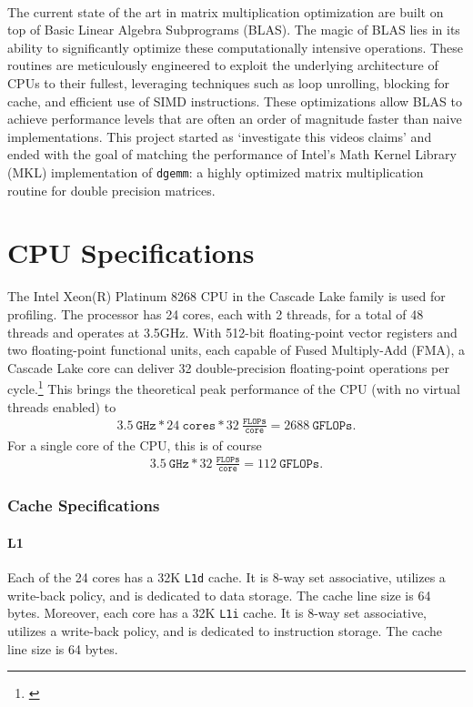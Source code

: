 \documentclass{article}
\newcommand{\MYhref}[3][blue]{\href{#2}{\color{#1}{#3}}}%
\begin{document}
\

\noindent The current state of the art in matrix multiplication optimization are built 
on top of Basic Linear Algebra Subprograms (BLAS). The magic of BLAS lies in its ability 
to significantly optimize these computationally intensive operations. 
These routines are meticulously engineered to exploit the underlying architecture of CPUs to their fullest, 
leveraging techniques such as loop unrolling, blocking for cache, and efficient use of SIMD instructions. 
These optimizations allow BLAS to achieve performance levels that are often an order 
of magnitude faster than naive implementations. This project started as 
`investigate this videos claims' and ended with the goal of matching the performance 
of Intel's Math Kernel Library (MKL) implementation of \texttt{dgemm}: a highly optimized 
matrix multiplication routine for double precision matrices. 

\section{CPU Specifications}\label{SEC:CPU-SPECS}
The Intel Xeon(R) Platinum 8268 CPU in the Cascade Lake family is used for profiling. 
The processor has 24 cores, each with 2 threads, for a total of 48 threads and operates 
at 3.5GHz. With 512-bit floating-point vector registers and two floating-point 
functional units, each capable of Fused Multiply-Add (FMA), a Cascade Lake core can 
deliver 32 double-precision floating-point operations per cycle.\footnote{\MYhref{https://www.nas.nasa.gov/hecc/support/kb/cascade-lake-processors_579.html}{https://www.nas.nasa.gov/hecc/support/kb/cascade-lake-processors\_579.html}}
This brings the theoretical peak performance of the CPU (with no virtual threads enabled) to 
\begin{align*}
    3.5\ \texttt{GHz} * 24\ \texttt{cores} * 32\ \frac{\texttt{FLOPs}}{\texttt{core}} = 2688\ \texttt{GFLOPs}.
\end{align*}
For a single core of the CPU, this is of course
\begin{align*}
    3.5\ \texttt{GHz} * 32\ \frac{\texttt{FLOPs}}{\texttt{core}} = 112 \ \texttt{GFLOPs}. 
\end{align*}

\subsubsection*{Cache Specifications}
\paragraph{L1}
Each of the 24 cores has a 32K \texttt{L1d} cache. It is 8-way set associative, utilizes a write-back policy, and is dedicated to data storage. The cache line size is 64 bytes.
Moreover, each core has a 32K \texttt{L1i} cache. It is 8-way set associative, utilizes a write-back policy, and is dedicated to instruction storage. The cache line size is 64 bytes.
\end{document}
